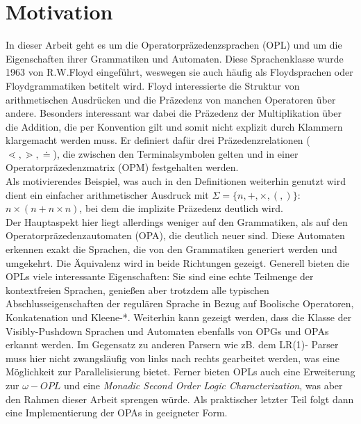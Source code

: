 \section{Motivation}
In dieser Arbeit geht es um die Operatorpräzedenzsprachen (OPL) und um die Eigenschaften ihrer Grammatiken und Automaten. Diese Sprachenklasse wurde 1963 von R.W.Floyd eingeführt, weswegen sie auch häufig als Floydsprachen oder Floydgrammatiken betitelt wird. Floyd interessierte die Struktur von arithmetischen Ausdrücken und die Präzedenz von manchen Operatoren über andere. Besonders interessant war dabei die Präzedenz der Multiplikation über die Addition, die per Konvention gilt und somit nicht explizit durch Klammern klargemacht werden muss. Er definiert dafür drei Präzedenzrelationen ($\lessdot, \gtrdot, \doteq$), die zwischen den Terminalsymbolen gelten und in einer Operatorpräzedenzmatrix (OPM) festgehalten werden.\\
Als motivierendes Beispiel, was auch in den Definitionen weiterhin genutzt wird dient ein einfacher arithmetischer Ausdruck mit $\Sigma = \{n, +, \times, (, )\}$:\\ $ n \times (n + n \times n)$, bei dem die implizite Präzedenz deutlich wird.\\
Der Hauptaspekt hier liegt allerdings weniger auf den Grammatiken, als auf den Operatorpräzedenzautomaten (OPA), die deutlich neuer sind. Diese Automaten erkennen exakt die Sprachen, die von den Grammatiken generiert werden und umgekehrt. Die Äquivalenz wird in beide Richtungen gezeigt.
Generell bieten die OPLs viele interessante Eigenschaften: Sie sind eine echte Teilmenge der kontextfreien Sprachen, genießen aber trotzdem alle typischen Abschlusseigenschaften der regulären Sprache in Bezug auf Boolische Operatoren, Konkatenation und Kleene-*. 
Weiterhin kann gezeigt werden, dass die Klasse der Visibly-Pushdown Sprachen und Automaten ebenfalls von OPGs und OPAs erkannt werden. Im Gegensatz zu anderen Parsern wie zB. dem LR(1)- Parser muss hier nicht zwangsläufig von links nach rechts gearbeitet werden, was eine Möglichkeit zur Parallelisierung bietet. Ferner bieten OPLs auch eine Erweiterung zur $\omega- OPL$ und eine \textit{Monadic Second Order Logic Characterization}, was aber den Rahmen dieser Arbeit sprengen würde.
Als praktischer letzter Teil folgt dann eine Implementierung der OPAs in geeigneter Form.